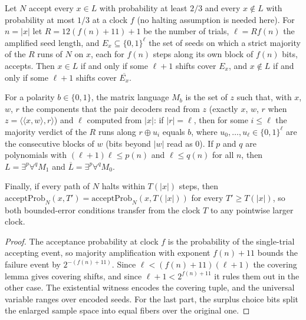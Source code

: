 \begin{lemma}
  \label{lem:randomness-lautemann-char}
  \leanok
  Let $N$ accept every $x \in L$ with probability at least $2/3$ and every
  $x \notin L$ with probability at most $1/3$ at a clock $f$ (no halting
  assumption is needed here). For $n = |x|$ let $R = 12(f(n) + 11) + 1$ be the
  number of trials, $\ell = R f(n)$ the amplified seed length, and
  $E_x \subseteq \{0,1\}^{\ell}$ the set of seeds on which a strict majority of
  the $R$ runs of $N$ on $x$, each for $f(n)$ steps along its own block of
  $f(n)$ bits, accepts. Then $x \in L$ if and only if some $\ell + 1$ shifts
  cover $E_x$, and $x \notin L$ if and only if some $\ell + 1$ shifts cover
  $\overline{E_x}$.

  For a polarity $b \in \{0,1\}$, the matrix language $M_b$ is the set of $z$
  such that, with $x$, $w$, $r$ the components that the pair decoders read
  from $z$ (exactly $x$, $w$, $r$ when $z = \langle \langle x, w \rangle, r
  \rangle$) and $\ell$ computed from $|x|$: if $|r| = \ell$, then for some
  $i \le \ell$ the majority verdict of the $R$ runs along $r \oplus u_i$ equals
  $b$, where $u_0, \dots, u_{\ell} \in \{0,1\}^{\ell}$ are the consecutive
  blocks of $w$ (bits beyond $|w|$ read as $0$). If $p$ and $q$ are polynomials
  with $(\ell + 1)\ell \le p(n)$ and $\ell \le q(n)$ for all $n$, then
  $L = \exists^p \forall^q M_1$ and $\overline{L} = \exists^p \forall^q M_0$.

  Finally, if every path of $N$ halts within $T(|x|)$ steps, then
  $\mathrm{acceptProb}_N(x, T') = \mathrm{acceptProb}_N(x, T(|x|))$ for every
  $T' \ge T(|x|)$, so both bounded-error conditions transfer from the clock
  $T$ to any pointwise larger clock.
\end{lemma}
\begin{proof}
  \leanok
  The acceptance probability at clock $f$ is the probability of the
  single-trial accepting event, so majority amplification with exponent
  $f(n) + 11$ bounds the failure event by $2^{-(f(n)+11)}$. Since
  $\ell < (f(n) + 11)(\ell + 1)$ the covering lemma gives covering shifts, and
  since $\ell + 1 < 2^{f(n)+11}$ it rules them out in the other case. The
  existential witness encodes the covering tuple, and the universal variable
  ranges over encoded seeds. For the last part, the surplus choice bits split
  the enlarged sample space into equal fibers over the original one.
\end{proof}

